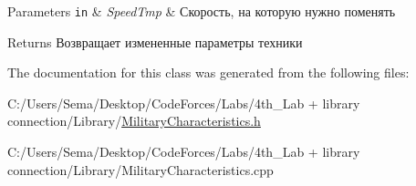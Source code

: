 \begin{DoxyParams}[1]{Parameters}
\mbox{\tt in}  & {\em Speed\+Tmp} & Скорость, на которую нужно поменять \\
\hline
\end{DoxyParams}
\begin{DoxyReturn}{Returns}
Возвращает измененные параметры техники 
\end{DoxyReturn}


The documentation for this class was generated from the following files\+:\begin{DoxyCompactItemize}
\item 
C\+:/\+Users/\+Sema/\+Desktop/\+Code\+Forces/\+Labs/4th\+\_\+\+Lab + library connection/\+Library/\mbox{\hyperlink{_military_characteristics_8h}{Military\+Characteristics.\+h}}\item 
C\+:/\+Users/\+Sema/\+Desktop/\+Code\+Forces/\+Labs/4th\+\_\+\+Lab + library connection/\+Library/Military\+Characteristics.\+cpp\end{DoxyCompactItemize}
